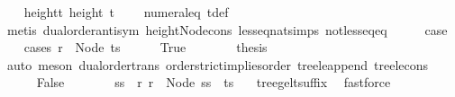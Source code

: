 \begin{isabellebody}
\ \ \isamarkupfalse%
\ height{\isacharunderscore}{\kern0pt}t{\isacharcolon}{\kern0pt}\ {\isachardoublequoteopen}height\ t\ {\isasymge}\ {}{\isachardoublequoteclose}\ \isamarkupfalse%
\ numeral{\isacharunderscore}{\kern0pt}{}{\isacharunderscore}{\kern0pt}eq{\isacharunderscore}{\kern0pt}{}\ t{\isacharunderscore}{\kern0pt}def\isanewline
\ \ \ \ \isamarkupfalse%
\ {\isacharparenleft}{\kern0pt}metis\ dual{\isacharunderscore}{\kern0pt}order{\isachardot}{\kern0pt}antisym\ height{\isacharunderscore}{\kern0pt}Node{\isacharunderscore}{\kern0pt}cons\ less{\isacharunderscore}{\kern0pt}eq{\isacharunderscore}{\kern0pt}nat{\isachardot}{\kern0pt}simps{\isacharparenleft}{\kern0pt}{}{\isacharparenright}{\kern0pt}\ not{\isacharunderscore}{\kern0pt}less{\isacharunderscore}{\kern0pt}eq{\isacharunderscore}{\kern0pt}eq{\isacharparenright}{\kern0pt}\isanewline
\ \ \isamarkupfalse%
\ \isamarkupfalse%
\ {\isacharquery}{\kern0pt}case\isanewline
\ \ \isamarkupfalse%
\ {\isacharparenleft}{\kern0pt}cases\ {\isachardoublequoteopen}r\ {\isacharless}{\kern0pt}\ Node\ ts{\isachardoublequoteclose}{\isacharparenright}{\kern0pt}\isanewline
\ \ \ \ \isamarkupfalse%
\ True\isanewline
\ \ \ \ \isamarkupfalse%
\ \isamarkupfalse%
\ {\isacharquery}{\kern0pt}thesis\ \isamarkupfalse%
\ {\isacharparenleft}{\kern0pt}auto{\isacharcomma}{\kern0pt}\ meson\ dual{\isacharunderscore}{\kern0pt}order{\isachardot}{\kern0pt}trans\ order{\isachardot}{\kern0pt}strict{\isacharunderscore}{\kern0pt}implies{\isacharunderscore}{\kern0pt}order\ tree{\isacharunderscore}{\kern0pt}le{\isacharunderscore}{\kern0pt}append\ tree{\isacharunderscore}{\kern0pt}le{\isacharunderscore}{\kern0pt}cons{\isacharparenright}{\kern0pt}\isanewline
\ \ \isamarkupfalse%
\isanewline
\ \ \ \ \isamarkupfalse%
\ False\isanewline
\ \ \ \ \isamarkupfalse%
\ \isamarkupfalse%
\ ss\ \ r{\isacharcolon}{\kern0pt}\ {\isachardoublequoteopen}r\ {\isacharequal}{\kern0pt}\ Node\ {\isacharparenleft}{\kern0pt}ss\ {\isacharat}{\kern0pt}\ ts{\isacharparenright}{\kern0pt}{\isachardoublequoteclose}\ \isamarkupfalse%
\ {}{\isacharparenleft}{\kern0pt}{}{\isacharparenright}{\kern0pt}\ tree{\isacharunderscore}{\kern0pt}ge{\isacharunderscore}{\kern0pt}lt{\isacharunderscore}{\kern0pt}suffix\ \isamarkupfalse%
\ fastforce\isanewline

\end{isabellebody}
